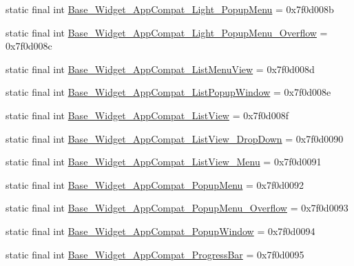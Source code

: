 \begin{DoxyCompactItemize}
\item 
static final int \mbox{\hyperlink{classandroid_1_1support_1_1design_1_1_r_1_1style_ae0baa30f59ccb138bfa0ee415debbda1}{Base\+\_\+\+Widget\+\_\+\+App\+Compat\+\_\+\+Light\+\_\+\+Popup\+Menu}} = 0x7f0d008b
\item 
static final int \mbox{\hyperlink{classandroid_1_1support_1_1design_1_1_r_1_1style_a61dcec87d76d5157b1216334f872be9d}{Base\+\_\+\+Widget\+\_\+\+App\+Compat\+\_\+\+Light\+\_\+\+Popup\+Menu\+\_\+\+Overflow}} = 0x7f0d008c
\item 
static final int \mbox{\hyperlink{classandroid_1_1support_1_1design_1_1_r_1_1style_a2902d79a90d846a65ebb595b4c30190a}{Base\+\_\+\+Widget\+\_\+\+App\+Compat\+\_\+\+List\+Menu\+View}} = 0x7f0d008d
\item 
static final int \mbox{\hyperlink{classandroid_1_1support_1_1design_1_1_r_1_1style_ad4b9f20b573cf189591167405c8d246d}{Base\+\_\+\+Widget\+\_\+\+App\+Compat\+\_\+\+List\+Popup\+Window}} = 0x7f0d008e
\item 
static final int \mbox{\hyperlink{classandroid_1_1support_1_1design_1_1_r_1_1style_a13de35b0cfc641359585568fe72994fc}{Base\+\_\+\+Widget\+\_\+\+App\+Compat\+\_\+\+List\+View}} = 0x7f0d008f
\item 
static final int \mbox{\hyperlink{classandroid_1_1support_1_1design_1_1_r_1_1style_aa4d2f59a86c267ef24a3fb00d578f3ee}{Base\+\_\+\+Widget\+\_\+\+App\+Compat\+\_\+\+List\+View\+\_\+\+Drop\+Down}} = 0x7f0d0090
\item 
static final int \mbox{\hyperlink{classandroid_1_1support_1_1design_1_1_r_1_1style_a9748000d54fe84d19a7f2ccad569c9bd}{Base\+\_\+\+Widget\+\_\+\+App\+Compat\+\_\+\+List\+View\+\_\+\+Menu}} = 0x7f0d0091
\item 
static final int \mbox{\hyperlink{classandroid_1_1support_1_1design_1_1_r_1_1style_a6fc90d604807e924feefb0adf2a7d2cc}{Base\+\_\+\+Widget\+\_\+\+App\+Compat\+\_\+\+Popup\+Menu}} = 0x7f0d0092
\item 
static final int \mbox{\hyperlink{classandroid_1_1support_1_1design_1_1_r_1_1style_a98001ced76638358f860dec36e44a24c}{Base\+\_\+\+Widget\+\_\+\+App\+Compat\+\_\+\+Popup\+Menu\+\_\+\+Overflow}} = 0x7f0d0093
\item 
static final int \mbox{\hyperlink{classandroid_1_1support_1_1design_1_1_r_1_1style_a49fc2bbb8931372170f422a8229577c2}{Base\+\_\+\+Widget\+\_\+\+App\+Compat\+\_\+\+Popup\+Window}} = 0x7f0d0094
\item 
static final int \mbox{\hyperlink{classandroid_1_1support_1_1design_1_1_r_1_1style_a2384abd094179a592f3c1c84ec9aabb7}{Base\+\_\+\+Widget\+\_\+\+App\+Compat\+\_\+\+Progress\+Bar}} = 0x7f0d0095

\end{DoxyCompactItemize}
